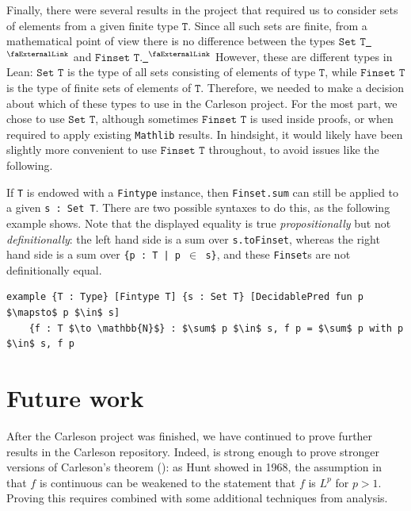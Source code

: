 \documentclass[12pt, reqno]{amsart}
\newcounter{lstlisting}[section]
\newcommand{\mathlib}{\texttt{Mathlib}\xspace}
\newcommand{\extlink}{~\ensuremath{{}^\text{\faExternalLink}}}
\theoremstyle{definition}
\theoremstyle{plain}
\begin{document}
Finally, there were several results in the project that required us to consider sets of elements from a given finite type $\texttt{T}$. Since all such sets are finite, from a mathematical point of view there is no difference between the types $\texttt{Set T}$\href{https://github.com/leanprover-community/mathlib4/blob/b63493a4746b4651fceb3bcf3a4651cc36a4b8de/Mathlib/Data/Set/Defs.lean#L44-L51}{\extlink} and $\texttt{Finset T}$.\href{https://github.com/leanprover-community/mathlib4/blob/b63493a4746b4651fceb3bcf3a4651cc36a4b8de/Mathlib/Data/Finset/Defs.lean#L72-L79}{\extlink}
However, these are different types in Lean: $\texttt{Set T}$ is the type of all sets consisting of elements of type $\texttt{T}$, while $\texttt{Finset T}$ is the type of finite sets of elements of $\texttt{T}$. Therefore, we needed to make a decision about which of these types to use in the Carleson project. For the most part, we chose to use $\texttt{Set T}$, although sometimes $\texttt{Finset T}$ is used inside proofs, or when required to apply existing \mathlib results. In hindsight, it would likely have been slightly more convenient to use $\texttt{Finset T}$ throughout, to avoid issues like the following.

If \texttt{T} is endowed with a \texttt{Fintype} instance, then \texttt{Finset.sum} can still be applied to a given \texttt{s : Set T}. There are two possible syntaxes to do this, as the following example shows. Note that the displayed equality is true \emph{propositionally} but not \emph{definitionally}: the left hand side is a sum over \texttt{s.toFinset}, whereas the right hand side is a sum over \texttt{\{p : T | p $\in$ s\}}, and these \texttt{Finset}s are not definitionally equal.
\begin{lstlisting}[mathescape]
example {T : Type} [Fintype T] {s : Set T} [DecidablePred fun p $\mapsto$ p $\in$ s]
	{f : T $\to \mathbb{N}$} : $\sum$ p $\in$ s, f p = $\sum$ p with p $\in$ s, f p
\end{lstlisting}

\section{Future work}\label{sec:future}

After the Carleson project was finished,
we have continued to prove further results in the Carleson repository.
Indeed,  is strong enough to prove stronger versions of Carleson's theorem ():
as Hunt \cite{MR238019} showed in 1968,
the assumption in  that $f$ is continuous
can be weakened to the statement that $f$ is $L^p$ for $p>1$.
Proving this requires  combined with some additional techniques from analysis.
\end{document}
